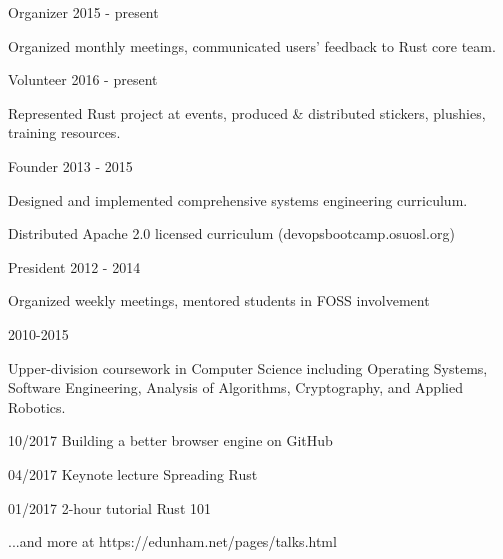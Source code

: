 \documentclass[11pt]{article} %
\begin{document}

\begin{description}
\squish
{}
           {Organizer}
           {2015 - present}

Organized monthly meetings, communicated users' feedback to Rust core team.

           {Volunteer}
           {2016 - present}

Represented Rust project at events, produced \& distributed stickers, plushies, training resources.

           {Founder}
           {2013 - 2015}

Designed and implemented comprehensive systems engineering curriculum.

Distributed Apache 2.0 licensed curriculum (devopsbootcamp.osuosl.org)

           {President}
           {2012 - 2014}

Organized weekly meetings, mentored students in FOSS involvement

\end{description}


\begin{description}
\squish
{}
           {}
           {2010-2015}

Upper-division coursework in Computer Science including Operating Systems,\\
Software Engineering, Analysis of Algorithms, Cryptography, and Applied Robotics.

\end{description}


\squish
{}
      {10/2017}
      {}
      {Building a better browser engine on GitHub}

      {04/2017}
      {Keynote lecture}
      {Spreading Rust}

      {01/2017}
      {2-hour tutorial}
      {Rust 101}

\hfill \small ...and more at https://edunham.net/pages/talks.html
\end{document}
